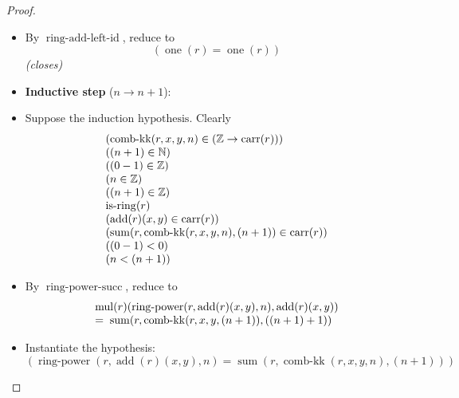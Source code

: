 \documentclass[11pt]{article}
\theoremstyle{plain}
\begin{document}
\begin{proof}
\begin{itemize}[leftmargin=2.8em, itemsep=4pt, parsep=1pt]
  \item[\textbf{13--14}] By $\operatorname{ring\text{-}add\text{-}left\text{-}id}$, reduce to
\begin{equation*}
(\operatorname{one}(r) = \operatorname{one}(r))
\end{equation*}
  \emph{(closes)}
  \item[]\textbf{Inductive step} ($n \to n + 1$):
  \item[\textbf{15--29}] Suppose $\text{the induction hypothesis}$. Clearly
\begin{equation*}
\begin{array}{@{}l@{}}
(\operatorname{comb\text{-}kk}(r, x, y, n) \in (\mathbb{Z} \to \operatorname{carr}(r))) \\
((n + 1) \in \mathbb{N}) \\
((0 - 1) \in \mathbb{Z}) \\
(n \in \mathbb{Z}) \\
((n + 1) \in \mathbb{Z}) \\
\operatorname{is\text{-}ring}(r) \\
(\operatorname{add}(r)(x, y) \in \operatorname{carr}(r)) \\
(\operatorname{sum}(r, \operatorname{comb\text{-}kk}(r, x, y, n), (n + 1)) \in \operatorname{carr}(r)) \\
((0 - 1) < 0) \\
(n < (n + 1))
\end{array}
\end{equation*}

  \item[\textbf{30}] By $\operatorname{ring\text{-}power\text{-}succ}$, reduce to
\begin{equation*}
\begin{array}{@{}l@{}} \operatorname{mul}(r)(\operatorname{ring\text{-}power}(r, \operatorname{add}(r)(x, y), n), \operatorname{add}(r)(x, y)) \\ =\; \operatorname{sum}(r, \operatorname{comb\text{-}kk}(r, x, y, (n + 1)), ((n + 1) + 1)) \end{array}
\end{equation*}

  \item[\textbf{31--33}] Instantiate the hypothesis:
\begin{equation*}
(\operatorname{ring\text{-}power}(r, \operatorname{add}(r)(x, y), n) = \operatorname{sum}(r, \operatorname{comb\text{-}kk}(r, x, y, n), (n + 1)))
\end{equation*}


\end{itemize}
\end{proof}
\end{document}
